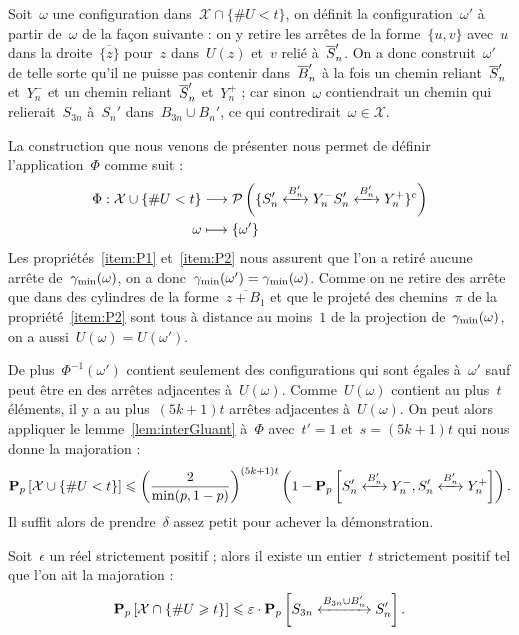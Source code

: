 			\begin{dem}
				Soit~$\omega$ une configuration dans~$\mathcal{X} \cap \{\# U < t\}$, on définit la configuration~$\omega'$ à partir de~$\omega$ de la façon suivante : on y retire les arrêtes de la forme~$\{u,v\}$ avec~$u$ dans la droite~$\overline{\{z\}}$ pour~$z$ dans~$U(z)$ et~$v$ relié à~$\SnB[n]'$.
				On a donc construit~$\omega'$ de telle sorte qu'il ne puisse pas contenir dans~$\BnB '$ à la fois un chemin reliant~$\SnB[n]'$ et~$Y_n^-$ et un chemin reliant~$\SnB[n]'$ et~$Y_n^+$ ; car sinon~$\omega$ contiendrait un chemin qui relierait~$S_{3n}$ à~$S_n'$ dans~$B_{3n}\cup B_n'$, ce qui contredirait~$\omega\in\mathcal{X}$.
			
				La construction que nous venons de présenter nous permet de définir l'application~$\Phi$ comme suit :
				\begin{align*}
					\Phi : \mathcal{X}\cup\{\# U < t\} 	& \longrightarrow 	
											\mathcal{P}\left(
												\{\relie[B_n']{S_n'}{Y_n^-}
												\relie[B_n']{S_n'}{Y_n^+}\}^c
											\right)\\
						\omega				& \longmapsto 		\{\omega'\}
				\end{align*}	
				Les propriétés~\ref{item:P1} et~\ref{item:P2} nous assurent que l'on a retiré aucune arrête de~$\Cmin$, on a donc~$\Cmin[\omega'] = \Cmin$. Comme on ne retire des arrête que dans des cylindres de la forme~$\overline{z+B_1}$ et que le projeté des chemins~$\pi$ de la propriété~\ref{item:P2} sont tous à distance au moins~$1$ de la projection de~$\Cmin$, on a aussi~$U(\omega) = U(\omega')$.

				De plus~$\Phi^{-1}(\omega')$ contient seulement des configurations qui sont égales à~$\omega'$ sauf peut être en des arrêtes adjacentes à~$U(\omega)$. Comme~$U(\omega)$ contient au plus~$t$ éléments, il y a au plus~$(5k+1)t$ arrêtes adjacentes à~$U(\omega)$. On peut alors appliquer le lemme~\ref{lem:interGluant} à~$\Phi$ avec~$t'=1$ et~$s=(5k+1)t$ qui nous donne la majoration :
				\[
						\Pp{\mathcal{X}\cup\{\#U < t\}}
					\leq
						\left(
							\frac{2}{\min(p,1-p)}
						\right)^{(5k+1)t}
						\left( 1 - \Pp{\relie[B_n']{S_n'}{Y_n^-}, \relie[B_n']{S_n'}{Y_n^+}}\right).
				\]
				Il suffit alors de prendre~$\delta$ assez petit pour achever la démonstration.
			\end{dem}
			\begin{prop}\label{prop:Ugrand}
				Soit~$\epsilon$ un réel strictement positif ; alors il existe un entier~$t$ strictement positif tel que l'on ait la majoration :
				\[
						\Pp{\mathcal{X}\cap\{\# U \geq t\}} 
					\leq 
						\epsilon
						\cdot
						\Pp{\relie[B_{3n}\cup B_n']{S_{3n}}{S_n'}}.
				\]
			\end{prop}
